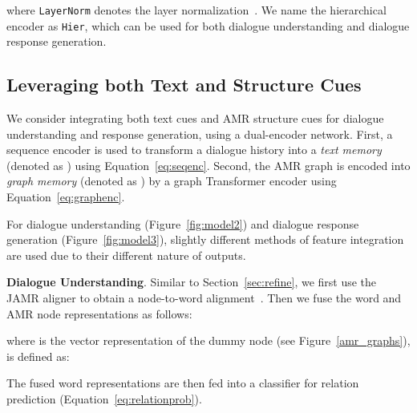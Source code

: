 \documentclass[11pt,a4paper]{article}
\begin{document}
where \texttt{LayerNorm} denotes the layer normalization~\cite{BaKH16}.
We name the hierarchical encoder as \texttt{Hier}, which can be used for both dialogue understanding and dialogue response generation.

\subsection{Leveraging both Text and Structure Cues}
\label{sec:exmem}
We consider integrating both text cues and AMR structure cues for dialogue understanding and response generation, using a dual-encoder network.
First, a sequence encoder is used to transform a dialogue history  into a \textit{text memory} (denoted as ) using Equation~\ref{eq:seqenc}.
Second, the AMR graph  is encoded into \textit{graph memory} (denoted as ) by a graph Transformer encoder using Equation~\ref{eq:graphenc}.

For dialogue understanding (Figure~\ref{fig:model2}) and dialogue response generation (Figure~\ref{fig:model3}), slightly different methods of feature integration are used due to their different nature of outputs.

\noindent\textbf{Dialogue Understanding}.
Similar to Section~\ref{sec:refine}, we first use the JAMR aligner to obtain a node-to-word alignment~.
Then we fuse the word and AMR node representations as follows:

where  is the vector representation of the dummy node (see Figure~\ref{amr_graphs}),  is defined as:

The fused word representations are then fed into a classifier for relation prediction (Equation~\ref{eq:relationprob}).
\end{document}

